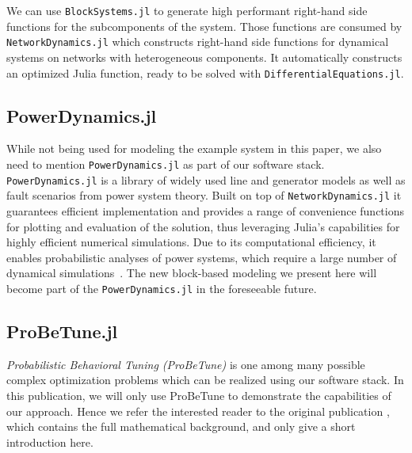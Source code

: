 \documentclass[conference]{IEEEtran}
\begin{document}
We can use \texttt{BlockSystems.jl} to generate high performant right-hand side functions for the subcomponents of the system. Those functions are consumed by \texttt{NetworkDynamics.jl}\cite{lindner2021networkdynamics} which constructs right-hand side functions for dynamical systems on networks with heterogeneous components. It automatically constructs an optimized Julia function, ready to be solved with \texttt{DifferentialEquations.jl}.

\subsection{PowerDynamics.jl}
While not being used for modeling the example system in this paper, we also need to mention \texttt{PowerDynamics.jl} as part of our software stack. \texttt{PowerDynamics.jl}\cite{plietzsch2021powerdynamics} is a library of widely used line and generator models as well as fault scenarios from power system theory. Built on top of \texttt{NetworkDynamics.jl} it guarantees efficient implementation and provides a range of convenience functions for plotting and evaluation of the solution, thus leveraging Julia's capabilities for highly efficient numerical simulations. Due to its computational efficiency, it enables probabilistic analyses of power systems, which require a large number of dynamical simulations~\cite{liemann2020probabilistic}. The new block-based modeling we present here will become part of the \texttt{PowerDynamics.jl} in the foreseeable future.

\subsection{ProBeTune.jl}
 \emph{Probabilistic Behavioral Tuning (ProBeTune)} is one among many possible complex optimization problems which can be realized using our software stack. In this publication, we will only use ProBeTune to demonstrate the capabilities of our approach. Hence we refer the interested reader to the original publication \cite{hellmann2021probetune}, which contains the full mathematical background, and only give a short introduction here.
\end{document}

